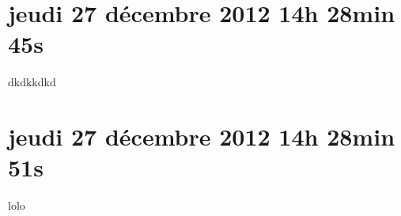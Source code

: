 
\section{jeudi 27 décembre 2012 14h 28min 45s}

dkdkkdkd

\section{jeudi 27 décembre 2012 14h 28min 51s}

lolo
